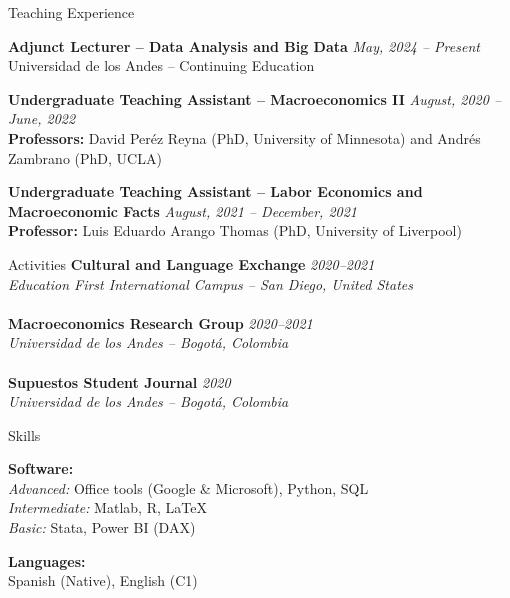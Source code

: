 \documentclass{resume}
\begin{document}


\begin{rSection}{Teaching Experience}

{\bf Adjunct Lecturer – Data Analysis and Big Data} \hfill {\em May, 2024 – Present} 
\\ Universidad de los Andes – Continuing Education


{\bf Undergraduate Teaching Assistant – Macroeconomics II} \hfill {\em August, 2020 – June, 2022} 
\\ \textbf{Professors:} David Peréz Reyna (PhD, University of Minnesota) and Andrés Zambrano (PhD, UCLA)

{\bf Undergraduate Teaching Assistant – Labor Economics and Macroeconomic Facts} \hfill {\em August, 2021 – December, 2021} 
\\ \textbf{Professor:} Luis Eduardo Arango Thomas (PhD, University of Liverpool)

\end{rSection}

\begin{rSection}{Activities} \itemsep -2pt
{\bf Cultural and Language Exchange} \hfill {\em 2020–2021} 
\\ \textit{Education First International Campus – San Diego, United States}
\\
\\
{\bf Macroeconomics Research Group} \hfill {\em 2020–2021} 
\\ \textit{Universidad de los Andes – Bogotá, Colombia}
\\
\\
{\bf Supuestos Student Journal} \hfill {\em 2020} 
\\ \textit{Universidad de los Andes – Bogotá, Colombia}
\end{rSection}

\begin{rSection}{Skills}

{\bf Software:}\\  \textit{Advanced:} Office tools (Google \& Microsoft), Python, SQL
\\ \textit{Intermediate:} Matlab, R, \LaTeX
\\ \textit{Basic:} Stata, Power BI (DAX)

{\bf Languages:} \\ Spanish (Native), English (C1)

\end{rSection}
\end{document}
